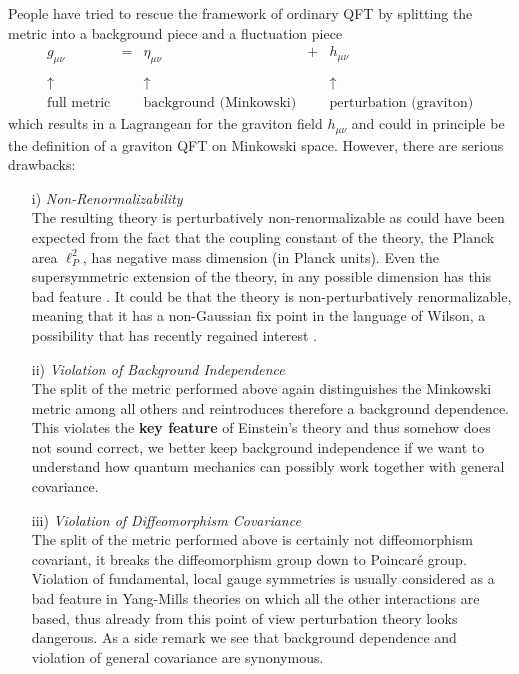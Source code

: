 \documentclass[12pt]{report}
\def\be{\begin{equation}}
\def\ee{\end{equation}}
\begin{document}
People have tried to rescue the framework of ordinary QFT by splitting
the metric into a background piece and a fluctuation piece
\be \label{1.1.1}
\left. \begin{array}{ccccc}
g_{\mu\nu} & = & \eta_{\mu\nu} & + & h_{\mu\nu} \\
& & & &\\
\uparrow & & \uparrow & & \uparrow \\
\mbox{full metric} & & \mbox{background (Minkowski)} & & 
\mbox{perturbation (graviton)}
\end{array} \right. 
\ee
which results in a Lagrangean for the graviton field $h_{\mu\nu}$
and could in principle be the definition of a graviton QFT on 
Minkowski space. However, there are serious drawbacks:
%
\begin{itemize}
%
\item[i)] {\it Non-Renormalizability}\\
The resulting theory is perturbatively non-renormalizable 
\cite{4} as could have 
been expected from the fact that the coupling constant of the theory,
the Planck area $\ell_P^2$, has negative mass dimension (in Planck units).
Even the supersymmetric extension of the theory, in any possible dimension 
has this bad feature \cite{5}. It could be that the theory is 
non-perturbatively renormalizable, meaning that it has a non-Gaussian 
fix point in the language of Wilson, a possibility that has recently
regained interest \cite{6}.
%
\item[ii)] {\it Violation of Background Independence}\\
The split of the metric performed above again distinguishes the Minkowski
metric among all others and reintroduces therefore a background 
dependence. This violates the {\bf key feature} of Einstein's theory
and thus somehow does not sound correct, we better keep background 
independence if we want to understand how quantum mechanics can possibly
work together with general covariance.
%
\item[iii)] {\it Violation of Diffeomorphism Covariance}\\
The split of the metric performed above is certainly not diffeomorphism
covariant, it breaks the diffeomorphism group down to Poincar\'e group.
Violation of fundamental, local gauge symmetries is usually considered 
as a bad feature in Yang-Mills theories on which all the other 
interactions are based, thus already from this point of view perturbation
theory looks dangerous. As a side remark we see that background dependence
and violation of general covariance are synonymous.

\end{itemize}
\end{document}
